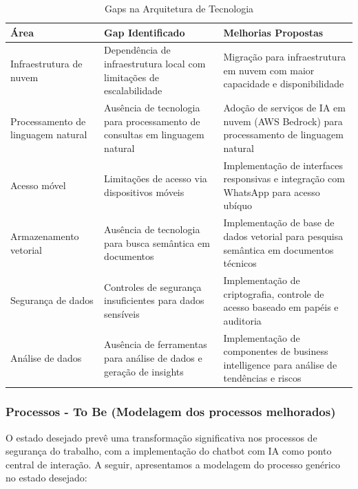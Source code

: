 \documentclass[12pt,a4paper]{article}
\begin{document}
\begin{table}[h]
\centering
\begin{tcolorbox}[enhanced, colback=white, colframe=gray!40, arc=3mm, boxrule=0.5pt]
\scriptsize
\begin{tabular}{|p{2.5cm}|p{4cm}|p{5cm}|}
\hline
\rowcolor{gray!20}
\textbf{Área} & \textbf{Gap Identificado} & \textbf{Melhorias Propostas} \\
\hline
Infraestrutura de nuvem & Dependência de infraestrutura local com limitações de escalabilidade & Migração para infraestrutura em nuvem com maior capacidade e disponibilidade \\
\hline
Processamento de linguagem natural & Ausência de tecnologia para processamento de consultas em linguagem natural & Adoção de serviços de IA em nuvem (AWS Bedrock) para processamento de linguagem natural \\
\hline
Acesso móvel & Limitações de acesso via dispositivos móveis & Implementação de interfaces responsivas e integração com WhatsApp para acesso ubíquo \\
\hline
Armazenamento vetorial & Ausência de tecnologia para busca semântica em documentos & Implementação de base de dados vetorial para pesquisa semântica em documentos técnicos \\
\hline
Segurança de dados & Controles de segurança insuficientes para dados sensíveis & Implementação de criptografia, controle de acesso baseado em papéis e auditoria \\
\hline
Análise de dados & Ausência de ferramentas para análise de dados e geração de insights & Implementação de componentes de business intelligence para análise de tendências e riscos \\
\hline
\end{tabular}
\end{tcolorbox}
\caption{Gaps na Arquitetura de Tecnologia}
\end{table}

\subsubsection{Processos - To Be (Modelagem dos processos melhorados)}

O estado desejado prevê uma transformação significativa nos processos de segurança do trabalho, com a implementação do chatbot com IA como ponto central de interação. A seguir, apresentamos a modelagem do processo genérico no estado desejado:
\end{document}
